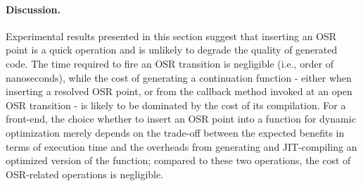 \begin{description}
\paragraph{Discussion.}

Experimental results presented in this section suggest that inserting an OSR point is a quick operation and is unlikely to degrade the quality of generated code. The time required to fire an OSR transition is negligible (i.e., order of nanoseconds), while the cost of generating a continuation function - either when inserting a resolved OSR point, or from the callback method invoked at an open OSR transition - is likely to be dominated by the cost of its compilation. For a front-end, the choice whether to insert an OSR point into a function for dynamic optimization merely depends on the trade-off between the expected benefits in terms of execution time and the overheads from generating and JIT-compiling an optimized version of the function; compared to these two operations, the cost of OSR-related operations is negligible.


\end{description}
